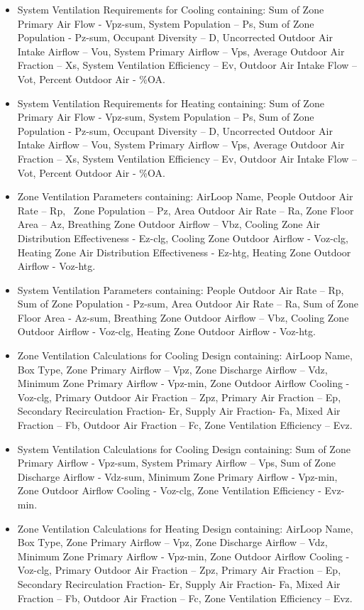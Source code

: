 \begin{itemize}
\item
  System Ventilation Requirements for Cooling containing: Sum of Zone Primary Air Flow - Vpz-sum, System Population -- Ps, Sum of Zone Population - Pz-sum, Occupant Diversity -- D, Uncorrected Outdoor Air Intake Airflow -- Vou, System Primary Airflow -- Vps, Average Outdoor Air Fraction -- Xs, System Ventilation Efficiency -- Ev, Outdoor Air Intake Flow -- Vot, Percent Outdoor Air - \%OA.
\item
  System Ventilation Requirements for Heating containing: Sum of Zone Primary Air Flow - Vpz-sum, System Population -- Ps, Sum of Zone Population - Pz-sum, Occupant Diversity -- D, Uncorrected Outdoor Air Intake Airflow -- Vou, System Primary Airflow -- Vps, Average Outdoor Air Fraction -- Xs, System Ventilation Efficiency -- Ev, Outdoor Air Intake Flow -- Vot, Percent Outdoor Air - \%OA.
\item
  Zone Ventilation Parameters containing: AirLoop Name, People Outdoor Air Rate -- Rp, ~Zone Population -- Pz, Area Outdoor Air Rate -- Ra, Zone Floor Area -- Az, Breathing Zone Outdoor Airflow -- Vbz, Cooling Zone Air Distribution Effectiveness - Ez-clg, Cooling Zone Outdoor Airflow - Voz-clg, Heating Zone Air Distribution Effectiveness - Ez-htg, Heating Zone Outdoor Airflow - Voz-htg.
\item
  System Ventilation Parameters containing: People Outdoor Air Rate -- Rp, Sum of Zone Population - Pz-sum, Area Outdoor Air Rate -- Ra, Sum of Zone Floor Area - Az-sum, Breathing Zone Outdoor Airflow -- Vbz, Cooling Zone Outdoor Airflow - Voz-clg, Heating Zone Outdoor Airflow - Voz-htg.
\item
  Zone Ventilation Calculations for Cooling Design containing: AirLoop Name, Box Type, Zone Primary Airflow -- Vpz, Zone Discharge Airflow -- Vdz, Minimum Zone Primary Airflow - Vpz-min, Zone Outdoor Airflow Cooling - Voz-clg, Primary Outdoor Air Fraction -- Zpz, Primary Air Fraction -- Ep, Secondary Recirculation Fraction- Er, Supply Air Fraction- Fa, Mixed Air Fraction -- Fb, Outdoor Air Fraction -- Fc, Zone Ventilation Efficiency -- Evz.
\item
  System Ventilation Calculations for Cooling Design containing: Sum of Zone Primary Airflow - Vpz-sum, System Primary Airflow -- Vps, Sum of Zone Discharge Airflow - Vdz-sum, Minimum Zone Primary Airflow - Vpz-min, Zone Outdoor Airflow Cooling - Voz-clg, Zone Ventilation Efficiency - Evz-min.
\item
  Zone Ventilation Calculations for Heating Design containing: AirLoop Name, Box Type, Zone Primary Airflow -- Vpz, Zone Discharge Airflow -- Vdz, Minimum Zone Primary Airflow - Vpz-min, Zone Outdoor Airflow Cooling - Voz-clg, Primary Outdoor Air Fraction -- Zpz, Primary Air Fraction -- Ep, Secondary Recirculation Fraction- Er, Supply Air Fraction- Fa, Mixed Air Fraction -- Fb, Outdoor Air Fraction -- Fc, Zone Ventilation Efficiency -- Evz.

\end{itemize}
